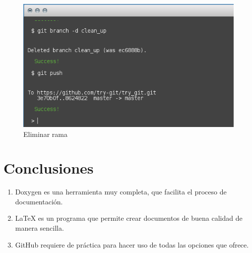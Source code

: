 \documentclass[11pt]{article}
\begin{document}
\begin{figure}[H]
	\centering
	\includegraphics[scale=0.8]{git_14.png}
	\caption{Eliminar rama}
	\label{fig:c14}
\end{figure}

\section{Conclusiones}
\begin{enumerate}
	\item Doxygen es una herramienta muy completa, que facilita el proceso de documentación.
	\item \LaTeX{} es un programa que permite crear documentos de buena calidad de manera sencilla.
	\item GitHub requiere de práctica para hacer uso de todas las opciones que ofrece.
\end{enumerate}
\end{document}
